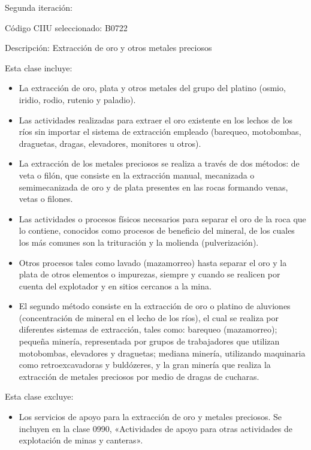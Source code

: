 \documentclass[
  11pt,
  a4paper,
]{book}
\begin{document}
Segunda iteración:

Código CIIU seleccionado: B0722

Descripción: Extracción de oro y otros metales preciosos

Esta clase incluye:

\begin{itemize}
\item La extracción de oro, plata y otros metales del grupo del platino (osmio, iridio, rodio, rutenio y paladio).
\item Las actividades realizadas para extraer el oro existente en los lechos de los ríos sin importar el sistema de extracción empleado (barequeo, motobombas, draguetas, dragas, elevadores, monitores u otros).
\item La extracción de los metales preciosos se realiza a través de dos métodos: de veta o filón, que consiste en la extracción manual, mecanizada o semimecanizada de oro y de plata presentes en las rocas formando venas, vetas o filones.
\item Las actividades o procesos físicos necesarios para separar el oro de la roca que lo contiene, conocidos como procesos de beneficio del mineral, de los cuales los más comunes son la trituración y la molienda (pulverización).
\item Otros procesos tales como lavado (mazamorreo) hasta separar el oro y la plata de otros elementos o impurezas, siempre y cuando se realicen por cuenta del explotador y en sitios cercanos a la mina.
\item El segundo método consiste en la extracción de oro o platino de aluviones (concentración de mineral en el lecho de los ríos), el cual se realiza por diferentes sistemas de extracción, tales como: barequeo (mazamorreo); pequeña minería, representada por grupos de trabajadores que utilizan motobombas, elevadores y draguetas; mediana minería, utilizando maquinaria como retroexcavadoras y buldózeres, y la gran minería que realiza la extracción de metales preciosos por medio de dragas de cucharas.
\end{itemize}

Esta clase excluye:

\begin{itemize}
\item Los servicios de apoyo para la extracción de oro y metales preciosos. Se incluyen en la clase 0990, «Actividades de apoyo para otras actividades de explotación de minas y canteras».
\end{itemize}
\end{document}
